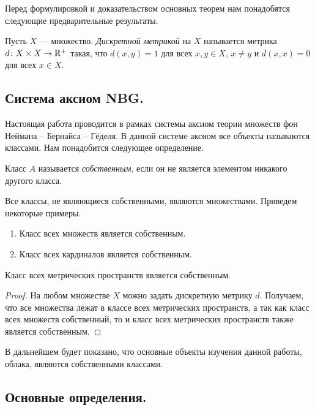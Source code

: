 Перед формулировкой и доказательством основных теорем нам понадобятся
следующие предварительные результаты.
\begin{definition}
  Пусть \( X \) --- множество. \emph{Дискретной метрикой} на \( X \)
  называется метрика \( d \colon X \times X \rightarrow \mathbb R^+ \)
  такая, что \( d(x,y) = 1 \) для всех \( x,y \in X \), \( x\neq y\)
  и \(  d(x,x) = 0 \) для всех \( x\in X \).
\end{definition}
\subsection{Система аксиом NBG.}
Настоящая работа проводится в рамках системы аксиом теории множеств
фон Неймана -- Бернайса -- Гёделя. В данной системе аксиом все
объекты называются классами. Нам понадобится следующее определение.
\begin{definition}
  Класс \( A \) называется \emph{собственным}, если он не является
  элементом никакого другого класса.
\end{definition}
Все классы, не являющиеся собственными, являются множествами.
Приведем некоторые примеры.
\begin{enumerate}
  \item Класс всех множеств является собственным.
  \item Класс всех кардиналов является собственным.
\end{enumerate}
\begin{lemma}
  Класс всех метрических пространств является собственным.
\end{lemma}
\begin{proof}
  На любом множестве \( X \) можно задать дискретную метрику \( d \).
  Получаем, что все множества
  лежат в классе всех метрических пространств, а так как класс всех
  множеств собственный, то и класс всех метрических пространств также
  является собственным.
\end{proof}
В дальнейшем будет показано, что основные объекты изучения данной
работы, облака, являются собственными классами.
\subsection{Основные определения.}

